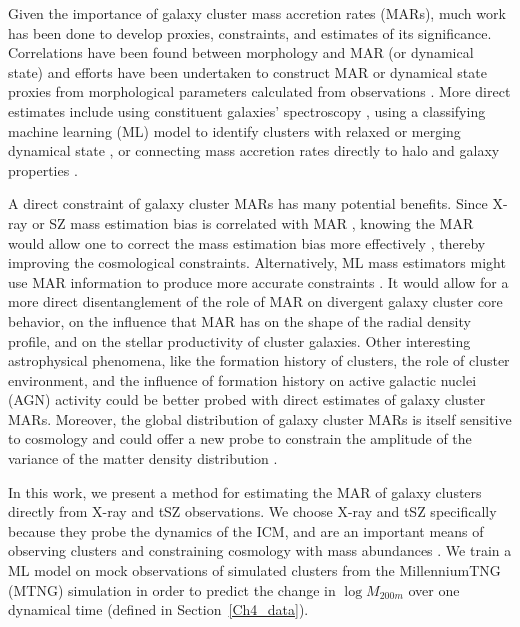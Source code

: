 Given the importance of galaxy cluster mass accretion rates (MARs), much work has been done to develop proxies, constraints, and estimates of its significance. Correlations have been found between morphology and MAR (or dynamical state) \cite[e.g.,][]{Gouin_2021} and efforts have been undertaken to construct MAR or dynamical state proxies from morphological parameters calculated from observations \cite[e.g.,][]{Perez_2023}. More direct estimates include using constituent galaxies' spectroscopy \cite[e.g.,][]{Pizzardo_2023}, using a classifying machine learning (ML) model to identify clusters with relaxed or merging dynamical state \cite{Arendt_2024}, or connecting mass accretion rates directly to halo and galaxy properties \cite{Mendoza_2023}. 

A direct constraint of galaxy cluster MARs has many potential benefits. Since X-ray or SZ mass estimation bias is correlated with MAR \cite{Nelson2012,Nelson2014a,Nelson2014b}, knowing the MAR would allow one to correct the mass estimation bias more effectively \cite{Shi2016}, thereby improving the cosmological constraints. Alternatively, ML mass estimators might use MAR information to produce more accurate constraints \cite[e.g.,][]{Ho_2023}. It would allow for a more direct disentanglement of the role of MAR on divergent galaxy cluster core behavior, on the influence that MAR has on the shape of the radial density profile, and on the stellar productivity of cluster galaxies. Other interesting astrophysical phenomena, like the formation history of clusters, the role of cluster environment, and the influence of formation history on active galactic nuclei (AGN) activity could be better probed with direct estimates of galaxy cluster MARs. Moreover, the global distribution of galaxy cluster MARs is itself sensitive to cosmology and could offer a new probe to constrain the amplitude of the variance of the matter density distribution \cite[][]{Amoura_2024}.

In this work, we present a method for estimating the MAR of galaxy clusters directly from X-ray and tSZ observations. We choose X-ray and tSZ specifically because they probe the dynamics of the ICM, and are an important means of observing clusters \cite[e.g.,][]{Hilton_2021, SPT_catalog, Bulbul_2024} and constraining cosmology with mass abundances \cite{SPT_Abundances, eROSITA_Cluster_Abundances_2024}. We train a ML model on mock observations of simulated clusters from the MillenniumTNG (MTNG) simulation \cite{MTNG_1, MTNG_2, MTNG_3, MTNG_4, MTNG_5, MTNG_6, MTNG_7, MTNG_8, MTNG_9, MTNG_10} in order to predict the change in $\log M_{200m}$ over one dynamical time (defined in Section~\ref{Ch4_data}). 

